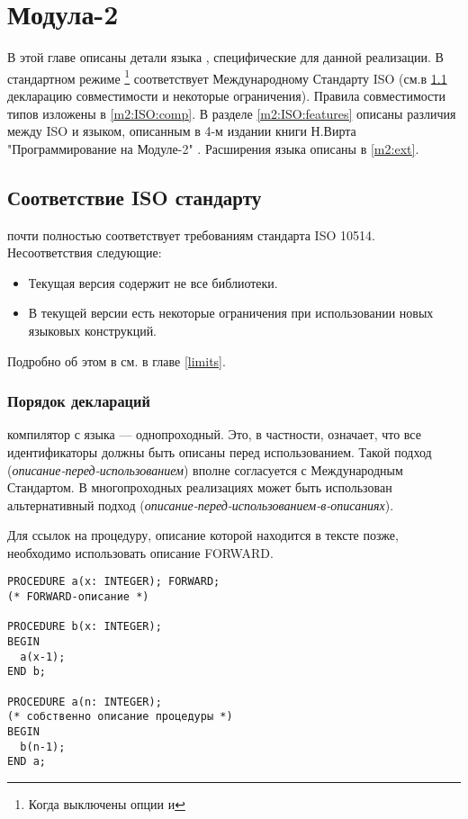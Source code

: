 \chapter{\XDS{} Модула-2}\label{m2}

В этой главе описаны детали языка
\mt{}, специфические для данной реализации. В стандартном режиме
\footnote{Когда выключены опции  и } 
\xds{} \mt{} соответствует Международному Стандарту ISO
(см.в \ref{m2:ISO} декларацию совместимости и некоторые ограничения).
Правила совместимости типов изложены в \ref{m2:ISO:comp}. 
В разделе \ref{m2:ISO:features} описаны различия между 
ISO \mt{} и языком, описанным в 4-м издании книги Н.Вирта
"Программирование на Модуле-2" \cite{PIM}.
Расширения языка описаны в \ref{m2:ext}.

\section{Соответствие ISO стандарту}\label{m2:ISO}

\xds{} \mt{} почти полностью соответствует требованиям стандарта
ISO 10514. Несоответствия следующие:
\begin{itemize}
\item Текущая версия содержит не все библиотеки.
\item В текущей версии есть некоторые ограничения при использовании
новых языковых конструкций.
\end{itemize}
Подробно об этом в см. в главе \ref{limits}.

\subsection{Порядок деклараций}\label{m2:dcl:order}

\xds{} компилятор с языка \mt{} --- однопроходный.
Это, в частности, означает, что все идентификаторы должны
быть описаны перед использованием.
Такой подход ({\em описание-перед-использованием}) вполне
согласуется с Международным Стандартом.
В многопроходных реализациях может быть использован
альтернативный подход 
({\em описание-перед-использованием-в-описаниях}).

Для ссылок на процедуру, описание которой находится в тексте позже,
необходимо использовать описание FORWARD.

\Example
\begin{verbatim}
PROCEDURE a(x: INTEGER); FORWARD;
(* FORWARD-описание *)

PROCEDURE b(x: INTEGER);
BEGIN
  a(x-1);
END b;

PROCEDURE a(n: INTEGER);
(* собственно описание процедуры *)
BEGIN
  b(n-1);
END a;
\end{verbatim}

